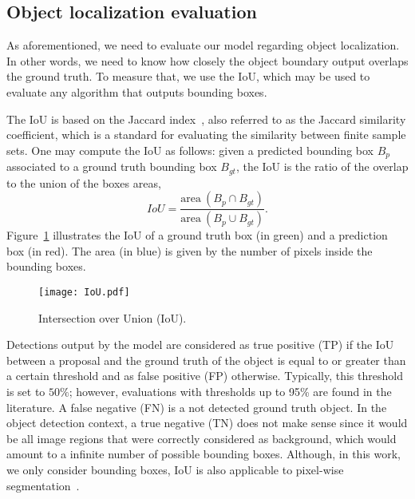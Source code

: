 \subsection{Object localization evaluation}
%
As aforementioned, we need to evaluate our model regarding object localization.
In other words, we need to know how closely the object boundary output overlaps the ground truth.
To measure that, we use the IoU,
which may be used to evaluate any algorithm that outputs bounding boxes.

The IoU is based on the Jaccard index~\cite{jaccard1912distribution}, also referred to as the Jaccard similarity coefficient, which is a standard for evaluating the similarity between finite sample sets.
One may compute the IoU as follows: given a predicted bounding box $B_{p}$ associated to a ground truth bounding box $B_{gt}$, the IoU is the ratio of the overlap to the union of the boxes areas,
%
\begin{equation}
 IoU = \frac{\textrm{area}~(B_p \cap B_{gt})}{\textrm{area}~(B_p \cup B_{gt})}
 \label{eq:IoU}.
\end{equation}
%
Figure~\ref{fig:IoU} illustrates the IoU of a ground truth box (in green) and a prediction box (in red).
The area (in blue) is given by the number of pixels inside the bounding boxes.
%
\begin{figure}[htb]
	\centering
	\texttt{[image: IoU.pdf]}
	\caption{Intersection over Union (IoU).}
	\label{fig:IoU}
\end{figure}

Detections output by the model are considered as true positive (TP) 
if the IoU between a proposal and the ground truth of the object is equal to or greater than a certain threshold and as false positive (FP) 
otherwise. Typically, this threshold is set to $50\%$; however, evaluations with thresholds up to 95\% are found in the literature.
A false negative (FN)  is a not detected ground truth object.
In the object detection context, a true negative (TN)  does not make sense since it would be all image regions that were
correctly considered as background, which would amount to a infinite number of possible bounding boxes.
Although, in this work, we only consider bounding boxes, IoU is also applicable to pixel-wise segmentation~\cite{He2017mask}.

